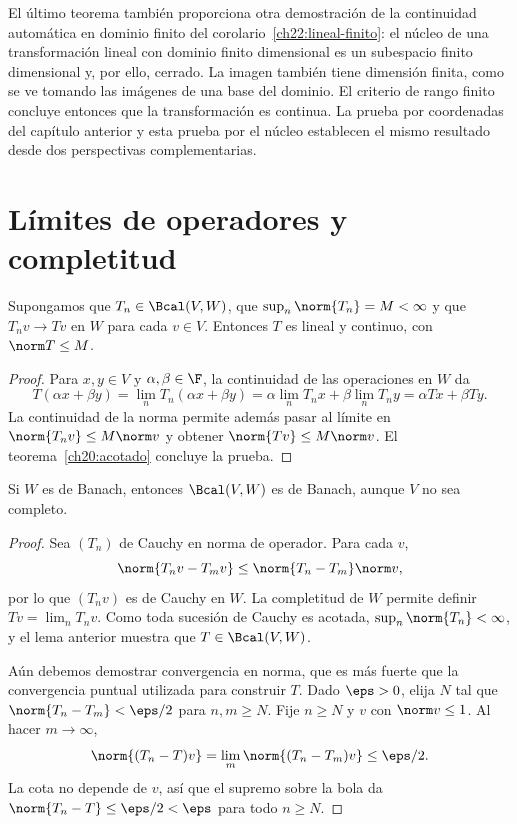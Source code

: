 El último teorema también proporciona otra demostración de la continuidad automática en dominio finito del corolario~\ref{ch22:lineal-finito}: el núcleo de una transformación lineal con dominio finito dimensional es un subespacio finito dimensional y, por ello, cerrado. La imagen también tiene dimensión finita, como se ve tomando las imágenes de una base del dominio. El criterio de rango finito concluye entonces que la transformación es continua. La prueba por coordenadas del capítulo anterior y esta prueba por el núcleo establecen el mismo resultado desde dos perspectivas complementarias.

\section{Límites de operadores y completitud}

\begin{lema}\label{ch20:limite-puntual}
Supongamos que $T_n\in\Bcal(V,W)$, que $\sup_n\norm{T_n}=M<\infty$ y que $T_nv\to Tv$ en $W$ para cada $v\in V$. Entonces $T$ es lineal y continuo, con $\norm T\leq M$.
\end{lema}
\begin{proof}
Para $x,y\in V$ y $\alpha,\beta\in\F$, la continuidad de las operaciones en $W$ da
\[
 T(\alpha x+\beta y)=\lim_nT_n(\alpha x+\beta y)
 =\alpha\lim_nT_nx+\beta\lim_nT_ny=\alpha Tx+\beta Ty.
\]
La continuidad de la norma permite además pasar al límite en $\norm{T_nv}\leq M\norm v$ y obtener $\norm{Tv}\leq M\norm v$. El teorema~\ref{ch20:acotado} concluye la prueba.
\end{proof}

\begin{teorema}\label{ch20:banach-operadores}
Si $W$ es de Banach, entonces $\Bcal(V,W)$ es de Banach, aunque $V$ no sea completo.
\end{teorema}
\begin{proof}
Sea $(T_n)$ de Cauchy en norma de operador. Para cada $v$,
\[
 \norm{T_nv-T_mv}\leq\norm{T_n-T_m}\norm v,
\]
por lo que $(T_nv)$ es de Cauchy en $W$. La completitud de $W$ permite definir $Tv=\lim_nT_nv$. Como toda sucesión de Cauchy es acotada, $\sup_n\norm{T_n}<\infty$, y el lema anterior muestra que $T\in\Bcal(V,W)$.

Aún debemos demostrar convergencia en norma, que es más fuerte que la convergencia puntual utilizada para construir $T$. Dado $\eps>0$, elija $N$ tal que $\norm{T_n-T_m}<\eps/2$ para $n,m\geq N$. Fije $n\geq N$ y $v$ con $\norm v\leq1$. Al hacer $m\to\infty$,
\[
 \norm{(T_n-T)v}=\lim_m\norm{(T_n-T_m)v}\leq\eps/2.
\]
La cota no depende de $v$, así que el supremo sobre la bola da $\norm{T_n-T}\leq\eps/2<\eps$ para todo $n\geq N$.
\end{proof}

